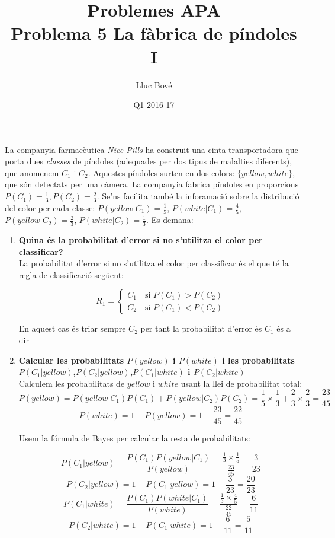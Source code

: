 \documentclass[a4paper]{article}
\title{Problemes APA \\ Problema 5 La fàbrica de píndoles I}
\author{Lluc Bové}
\date{Q1 2016-17}
\begin{document}
\maketitle

La companyia farmacèutica \textit{Nice Pills} ha construit una cinta transportadora que porta dues \textit{classes} de píndoles (adequades per dos tipus de malalties diferents), que anomenem $C_1$ i $C_2$. Aquestes píndoles surten en dos colors: $\{yellow,white\}$, que són detectats per una càmera. La companyia fabrica píndoles en proporcions $P(C_1) = \frac{1}{3}, P(C_2) = \frac{2}{3}$. Se'ns facilita també la inforamació sobre la distribució del color per cada classe: $P(yellow|C_1) = \frac{1}{5}$, $P(white | C_1) = \frac{4}{5}$, $P(yellow| C_2) = \frac{2}{3}$, $P(white|C_2) = \frac{1}{3}$. Es demana:
\begin{enumerate}
	
	\item\textbf{Quina és la probabilitat d'error si no s'utilitza el color per classificar?}\\
		
	La probabilitat d'error si no s'utilitza el color per classificar és el que té la regla de classificació següent:
	
	$$
	R_1 =
	\begin{cases}
	  C_1 \quad \text{si } P(C_1) > P(C_2) \\
	  C_2 \quad \text{si } P(C_1) < P(C_2)
	\end{cases}
	$$	
	
	En aquest cas és triar sempre $C_2$ per tant la probabilitat d'error és $C_1$ és a dir 
	
	\item\textbf{ Calcular les probabilitats $P(yellow)$ i $P(white)$ i les probabilitats $P(C_1|yellow)$,$P(C_2| yellow)$,$P(C_1 | white)$ i $P(C_2 | white)$} \\
	
	Calculem les probabilitats de $yellow$ i $white$ usant la llei de probabilitat total:
	$$
	P(yellow) = P(yellow | C_1) P(C_1) + P(yellow | C_2) P(C_2) = \frac{1}{5}\times\frac{1}{3} + \frac{2}{3}\times\frac{2}{3} = \boxed{\frac{23}{45}}
	$$
	$$
	P(white) = 1 - P(yellow) = 1 - \frac{23}{45} = \boxed{\frac{22}{45}} 
	$$
	
	Usem la fórmula de Bayes per calcular la resta de probabilitats:
	
	$$
	P(C_1 | yellow) = \frac{P(C_1)P(yellow | C_1)}{P(yellow)} = \frac{\frac{1}{3}\times \frac{1}{5}}{\frac{23}{45}} = \boxed{\frac{3}{23}}
	$$
	$$
	P(C_2 | yellow) = 1  - P(C_1 | yellow) = 1 - \frac{3}{23} = \boxed{\frac{20}{23}}
	$$
	$$
	P(C_1 | white) = \frac{P(C_1)P(white | C_1)}{P(white)} = \frac{\frac{1}{3}\times \frac{4}{5}}{\frac{22}{45}} = \boxed{\frac{6}{11}}
	$$
	$$
	P(C_2 | white) = 1 - P(C_1 | white) = 1 - \frac{6}{11} = \boxed{\frac{5}{11}}
	$$
	

\end{enumerate}
\end{document}

